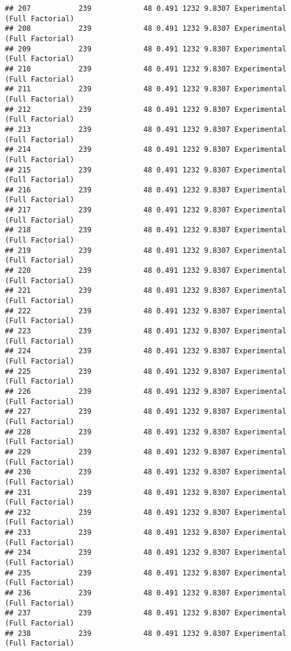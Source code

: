 \documentclass[]{article}
\begin{document}
\begin{verbatim}
## 207           239            48 0.491 1232 9.8307 Experimental (Full Factorial)
## 208           239            48 0.491 1232 9.8307 Experimental (Full Factorial)
## 209           239            48 0.491 1232 9.8307 Experimental (Full Factorial)
## 210           239            48 0.491 1232 9.8307 Experimental (Full Factorial)
## 211           239            48 0.491 1232 9.8307 Experimental (Full Factorial)
## 212           239            48 0.491 1232 9.8307 Experimental (Full Factorial)
## 213           239            48 0.491 1232 9.8307 Experimental (Full Factorial)
## 214           239            48 0.491 1232 9.8307 Experimental (Full Factorial)
## 215           239            48 0.491 1232 9.8307 Experimental (Full Factorial)
## 216           239            48 0.491 1232 9.8307 Experimental (Full Factorial)
## 217           239            48 0.491 1232 9.8307 Experimental (Full Factorial)
## 218           239            48 0.491 1232 9.8307 Experimental (Full Factorial)
## 219           239            48 0.491 1232 9.8307 Experimental (Full Factorial)
## 220           239            48 0.491 1232 9.8307 Experimental (Full Factorial)
## 221           239            48 0.491 1232 9.8307 Experimental (Full Factorial)
## 222           239            48 0.491 1232 9.8307 Experimental (Full Factorial)
## 223           239            48 0.491 1232 9.8307 Experimental (Full Factorial)
## 224           239            48 0.491 1232 9.8307 Experimental (Full Factorial)
## 225           239            48 0.491 1232 9.8307 Experimental (Full Factorial)
## 226           239            48 0.491 1232 9.8307 Experimental (Full Factorial)
## 227           239            48 0.491 1232 9.8307 Experimental (Full Factorial)
## 228           239            48 0.491 1232 9.8307 Experimental (Full Factorial)
## 229           239            48 0.491 1232 9.8307 Experimental (Full Factorial)
## 230           239            48 0.491 1232 9.8307 Experimental (Full Factorial)
## 231           239            48 0.491 1232 9.8307 Experimental (Full Factorial)
## 232           239            48 0.491 1232 9.8307 Experimental (Full Factorial)
## 233           239            48 0.491 1232 9.8307 Experimental (Full Factorial)
## 234           239            48 0.491 1232 9.8307 Experimental (Full Factorial)
## 235           239            48 0.491 1232 9.8307 Experimental (Full Factorial)
## 236           239            48 0.491 1232 9.8307 Experimental (Full Factorial)
## 237           239            48 0.491 1232 9.8307 Experimental (Full Factorial)
## 238           239            48 0.491 1232 9.8307 Experimental (Full Factorial)

\end{verbatim}
\end{document}
